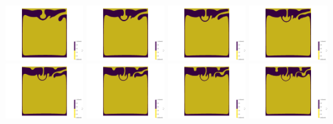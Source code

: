 \begin{itemize}
\begin{center}
\includegraphics[width=3cm]{images/benchmark_vaks97/aspect/lvl7/composition_threshold0011}
\includegraphics[width=3cm]{images/benchmark_vaks97/aspect/lvl7/composition_threshold0012}
\includegraphics[width=3cm]{images/benchmark_vaks97/aspect/lvl7/composition_threshold0013}
\includegraphics[width=3cm]{images/benchmark_vaks97/aspect/lvl7/composition_threshold0014}\\
\includegraphics[width=3cm]{images/benchmark_vaks97/aspect/lvl7/composition_threshold0015}
\includegraphics[width=3cm]{images/benchmark_vaks97/aspect/lvl7/composition_threshold0016}
\includegraphics[width=3cm]{images/benchmark_vaks97/aspect/lvl7/composition_threshold0017}
\includegraphics[width=3cm]{images/benchmark_vaks97/aspect/lvl7/composition_threshold0018}

\end{center}
\end{itemize}
